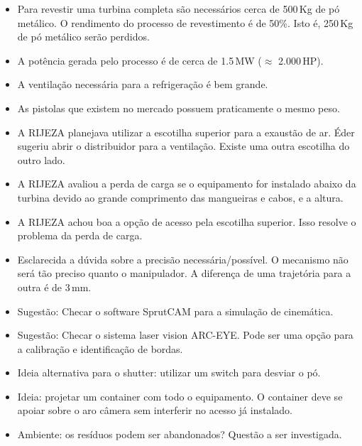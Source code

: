 \documentclass[12pt,a4paper]{article}
\begin{document}
\begin{itemize}  
  \item Para revestir uma turbina completa são necessários cerca de 500\,Kg de
  pó metálico. O rendimento do processo de revestimento é de 50\%. Isto é, 250\,Kg de pó metálico serão perdidos.
  
  \item A potência gerada pelo processo é de cerca de 1.5\,MW ($\approx$ 2.000\,HP).
   
  \item A ventilação necessária para a refrigeração é bem grande.
  
  \item As pistolas que existem no mercado possuem praticamente o mesmo peso.
   
  \item A RIJEZA planejava utilizar a escotilha superior para a exaustão de ar.
Éder sugeriu abrir o distribuidor para a ventilação. Existe uma outra escotilha
do outro lado.

  \item A RIJEZA avaliou a perda de carga se o equipamento for instalado abaixo
  da turbina devido ao grande comprimento das mangueiras e cabos, e a altura.

  \item A RIJEZA achou boa a opção de acesso pela escotilha superior. Isso resolve o problema da perda de carga.

  \item Esclarecida a dúvida sobre a precisão necessária/possível. O mecanismo
  não será tão preciso quanto o manipulador. A diferença de uma trajetória para
  a outra é de 3\,mm.

  \item Sugestão: Checar o software SprutCAM para a simulação de cinemática.

  \item Sugestão: Checar o sistema laser vision ARC-EYE. Pode ser uma opção para
  a calibração e identificação de bordas.

  \item Ideia alternativa para o shutter: utilizar um switch para desviar o pó.
  
  \item Ideia: projetar um container com todo o equipamento. O container deve se
  apoiar sobre o aro câmera sem interferir no acesso já instalado.

  \item Ambiente: os resíduos podem ser abandonados? Questão a ser investigada.


\end{itemize}
\end{document}
